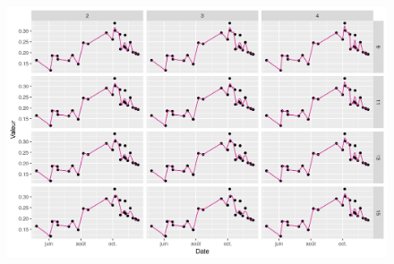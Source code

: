 \begin{figure}[htbp]
 \begin{center}
  \includegraphics[scale=0.7]{annexes/savgol_prs_3.png} 
 \end{center}
\end{figure}

% 
% 
